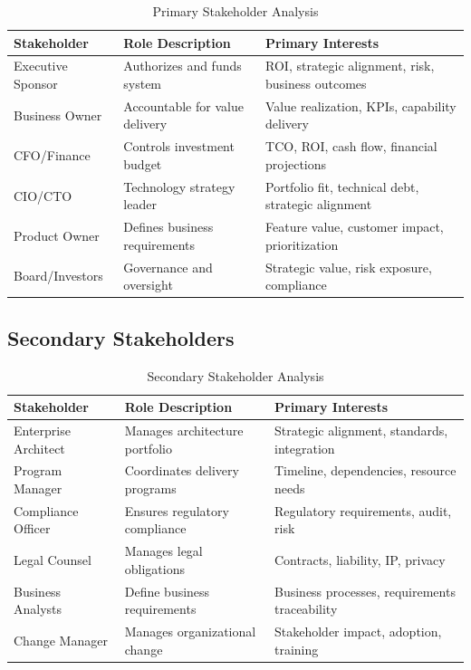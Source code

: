 \documentclass[11pt,letterpaper]{article}
\begin{document}
\begin{table}[H]
\centering
\caption{Primary Stakeholder Analysis}
\small
\begin{tabular}{@{}L{2.6cm}L{3.6cm}L{7cm}@{}}
\toprule
\textbf{Stakeholder} & \textbf{Role Description} & \textbf{Primary Interests} \\
\midrule
Executive Sponsor & Authorizes and funds system & ROI, strategic alignment, risk, business outcomes \\
\addlinespace
Business Owner & Accountable for value delivery & Value realization, KPIs, capability delivery \\
\addlinespace
CFO/Finance & Controls investment budget & TCO, ROI, cash flow, financial projections \\
\addlinespace
CIO/CTO & Technology strategy leader & Portfolio fit, technical debt, strategic alignment \\
\addlinespace
Product Owner & Defines business requirements & Feature value, customer impact, prioritization \\
\addlinespace
Board/Investors & Governance and oversight & Strategic value, risk exposure, compliance \\
\bottomrule
\end{tabular}
\end{table}

\subsection{Secondary Stakeholders}

\begin{table}[H]
\centering
\caption{Secondary Stakeholder Analysis}
\small
\begin{tabular}{@{}L{2.6cm}L{3.6cm}L{7cm}@{}}
\toprule
\textbf{Stakeholder} & \textbf{Role Description} & \textbf{Primary Interests} \\
\midrule
Enterprise Architect & Manages architecture portfolio & Strategic alignment, standards, integration \\
\addlinespace
Program Manager & Coordinates delivery programs & Timeline, dependencies, resource needs \\
\addlinespace
Compliance Officer & Ensures regulatory compliance & Regulatory requirements, audit, risk \\
\addlinespace
Legal Counsel & Manages legal obligations & Contracts, liability, IP, privacy \\
\addlinespace
Business Analysts & Define business requirements & Business processes, requirements traceability \\
\addlinespace
Change Manager & Manages organizational change & Stakeholder impact, adoption, training \\
\bottomrule
\end{tabular}
\end{table}
\end{document}
